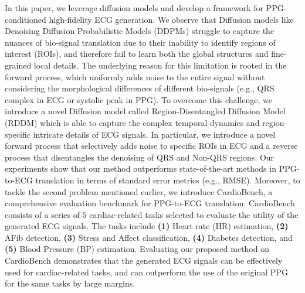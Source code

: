 \documentclass[letterpaper]{article} %
\begin{document}
In this paper, we leverage diffusion models \cite{sohl2015deep} and develop a framework for PPG-conditioned high-fidelity ECG generation. We observe that Diffusion models like Denoising Diffusion Probabilistic Models (DDPMs) \cite{ho2020denoising} struggle to capture the nuances of bio-signal translation due to their inability to identify regions of interest (ROIs), and therefore fail to learn both the global structures and fine-grained local details. The underlying reason for this limitation is rooted in the forward process, which uniformly adds noise to the entire signal without considering the morphological differences of different bio-signals (e.g., QRS complex in ECG or systolic peak in PPG). To overcome this challenge, we introduce a novel Diffusion model called Region-Disentangled Diffusion Model (RDDM) which is able to capture the complex temporal dynamics and region-specific intricate details of ECG signals. In particular, we introduce a novel forward process that selectively adds noise to specific ROIs in ECG and a reverse process that disentangles the denoising of QRS and Non-QRS regions. 
Our experiments show that our method outperforms state-of-the-art methods in PPG-to-ECG translation in terms of standard error metrics (e.g., RMSE). Moreover, to tackle the second problem mentioned earlier, we introduce CardioBench, a comprehensive evaluation benchmark for PPG-to-ECG translation. CardioBench consists of a series of $5$ cardiac-related tasks selected to evaluate the utility of the generated ECG signals. The tasks 
include \textbf{(1)} Heart rate (HR) estimation, \textbf{(2)} AFib detection, \textbf{(3)} Stress and Affect classification, \textbf{(4)} Diabetes detection, and \textbf{(5)} Blood Pressure (BP) estimation. Evaluating our proposed method on CardioBench demonstrates that the generated ECG signals can be effectively used for cardiac-related tasks, and can outperform the use of the original PPG for the same tasks by large margins.
\end{document}
